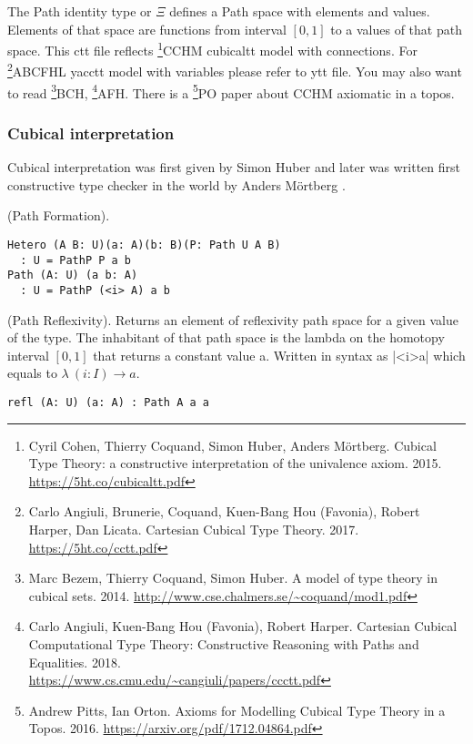 \documentclass{article}
\begin{document}
The Path identity type or $\Xi$ defines a Path space with elements and values.
Elements of that space are functions from interval $[0,1]$ to a values of that path space.
This ctt file reflects \footnote{Cyril Cohen, Thierry Coquand, Simon Huber, Anders M{\"{o}}rtberg. Cubical Type Theory: a constructive interpretation of the univalence axiom. 2015. \url{https://5ht.co/cubicaltt.pdf}}{CCHM} cubicaltt model with connections.
For \footnote{Carlo Angiuli, Brunerie, Coquand, Kuen-Bang Hou (Favonia), Robert Harper, Dan Licata. Cartesian Cubical Type Theory. 2017. \url{https://5ht.co/cctt.pdf}}{ABCFHL} yacctt model with
variables please refer to ytt file. You may also want to
read \footnote{Marc Bezem, Thierry Coquand, Simon Huber. A model of type theory in cubical sets. 2014. \url{http://www.cse.chalmers.se/~coquand/mod1.pdf}}{BCH},
\footnote{Carlo Angiuli, Kuen-Bang Hou (Favonia), Robert Harper. Cartesian Cubical Computational Type Theory: Constructive Reasoning with Paths and Equalities. 2018. \\ \url{https://www.cs.cmu.edu/~cangiuli/papers/ccctt.pdf}}{AFH}.
There is a \footnote{Andrew Pitts, Ian Orton. Axioms for Modelling Cubical Type Theory in a Topos. 2016. \url{https://arxiv.org/pdf/1712.04864.pdf}}{PO} paper about CCHM axiomatic in a topos.

\subsubsection*{Cubical interpretation}

Cubical interpretation was first given by Simon Huber \cite{Huber16} and later was
written first constructive type checker in the world by Anders M{\"{o}}rtberg \cite{Mortberg17}.

\begin{definition} (Path Formation).
\begin{lstlisting}
Hetero (A B: U)(a: A)(b: B)(P: Path U A B)
  : U = PathP P a b
Path (A: U) (a b: A)
  : U = PathP (<i> A) a b
\end{lstlisting}
\end{definition}

\begin{definition} (Path Reflexivity).
Returns an element of reflexivity path space for a given value of the type.
The inhabitant of that path space is the lambda on the homotopy
interval $[0,1]$ that returns a constant value a. Written in
syntax as |<i>a| which equals to $\lambda\ (i: I) \rightarrow a$.
\begin{lstlisting}
refl (A: U) (a: A) : Path A a a
\end{lstlisting}
\end{definition}
\end{document}
